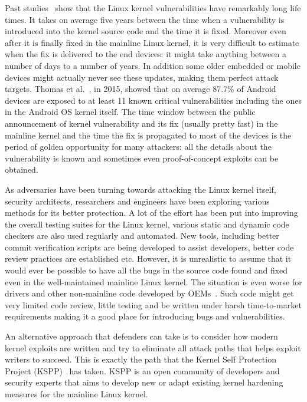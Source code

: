 Past studies~\cite{stoep2016android, cooklss2016} show that the Linux kernel vulnerabilities have remarkably long life times. It takes on average five years between the time when a vulnerability is introduced into the kernel source code and the time it is fixed. Moreover even after it is finally fixed in the mainline Linux kernel, it is very difficult to estimate when the fix is delivered to the end devices: it might take anything between a number of days to a number of years. In addition some older embedded or mobile devices might actually never see these updates, making them perfect attack targets. Thomas et al.~\cite{Thomas2015}, in 2015, showed that on average 87.7\% of Android devices are exposed to at least 11 known critical vulnerabilities including the ones in the Android OS kernel itself. The time window between the public announcement of kernel vulnerability and its fix (usually pretty fast) in the mainline kernel and the time the fix is propagated to most of the devices is the period of golden opportunity for many attackers: all the details about the vulnerability is known and sometimes even proof-of-concept exploits can be obtained.

As adversaries have been turning towards attacking the Linux kernel itself, security architects, researchers and engineers have been exploring various methods for its better protection. A lot of the effort has been put into improving the overall testing suites for the Linux kernel, various static and dynamic code checkers are also used regularly and automated. New tools, including better commit verification scripts are being developed to assist developers, better code review practices are established etc. However, it is unrealistic to assume that it would ever be possible to have all the bugs in the source code found and fixed even in the well-maintained mainline Linux kernel. The situation is even worse for drivers and other non-mainline code developed by OEMs~\cite{stoep2016android}. Such code might get very limited code review, little testing and be written under harsh time-to-market requirements making it a good place for introducing bugs and vulnerabilities.

An alternative approach that defenders can take is to consider how modern kernel exploits are written and try to eliminate all attack paths that helps exploit writers to succeed. This is exactly the path that the Kernel Self Protection Project (KSPP)~\cite{kspp} has taken. KSPP is an open community of developers and security experts that aims to develop new or adapt existing kernel hardening measures for the mainline Linux kernel. 

